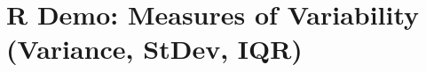 \documentclass[slidestop,compress,mathserif]{beamer}
\begin{document}
\section{R Demo: Measures of Variability (Variance, StDev, IQR)}



\end{document}
